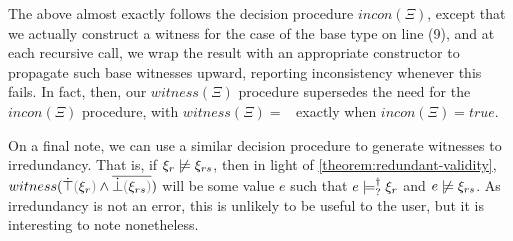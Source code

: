 The above almost exactly follows the decision procedure $incon(\Xi)$, except that we actually construct a witness for the case of the base type on line (9), and at each recursive call, we wrap the result with an appropriate constructor to propagate such base witnesses upward, reporting inconsistency whenever this fails. In fact, then, our $witness(\Xi)$ procedure supersedes the need for the $incon(\Xi)$ procedure, with $witness(\Xi) = $~ exactly when $incon(\Xi) = true$.

On a final note, we can use a similar decision procedure to generate witnesses to irredundancy. That is, if $\cnotsatisfy{\xi_r}{\xi_{rs}}$, then in light of \autoref{theorem:redundant-validity}, $witness(\cand{\ctruify{\xi_r}}{\cdual{\cfalsify{\xi_{rs}}}})$ will be some value $e$ such that $e \models_{?}^{\dag} \xi_r$ and $\cnotsatisfy{e}{\xi_{rs}}$. As irredundancy is not an error, this is unlikely to be useful to the user, but it is interesting to note nonetheless.